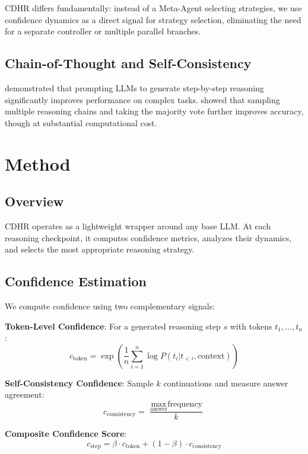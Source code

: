 \documentclass{article}
\begin{document}
CDHR differs fundamentally: instead of a Meta-Agent selecting strategies, we use confidence dynamics as a direct signal for strategy selection, eliminating the need for a separate controller or multiple parallel branches.

\subsection{Chain-of-Thought and Self-Consistency}

\citet{wei2022chain} demonstrated that prompting LLMs to generate step-by-step reasoning significantly improves performance on complex tasks. \citet{wang2022self} showed that sampling multiple reasoning chains and taking the majority vote further improves accuracy, though at substantial computational cost.

\section{Method}

\subsection{Overview}

CDHR operates as a lightweight wrapper around any base LLM. At each reasoning checkpoint, it computes confidence metrics, analyzes their dynamics, and selects the most appropriate reasoning strategy.

\subsection{Confidence Estimation}

We compute confidence using two complementary signals:

\textbf{Token-Level Confidence}: For a generated reasoning step $s$ with tokens $t_1, \ldots, t_n$:
\begin{equation}
c_{\text{token}} = \exp\left(\frac{1}{n} \sum_{i=1}^n \log P(t_i | t_{<i}, \text{context})\right)
\end{equation}

\textbf{Self-Consistency Confidence}: Sample $k$ continuations and measure answer agreement:
\begin{equation}
c_{\text{consistency}} = \frac{\max_{\text{answer}} \text{frequency}}{k}
\end{equation}

\textbf{Composite Confidence Score}:
\begin{equation}
c_{\text{step}} = \beta \cdot c_{\text{token}} + (1-\beta) \cdot c_{\text{consistency}}
\end{equation}
\end{document}
